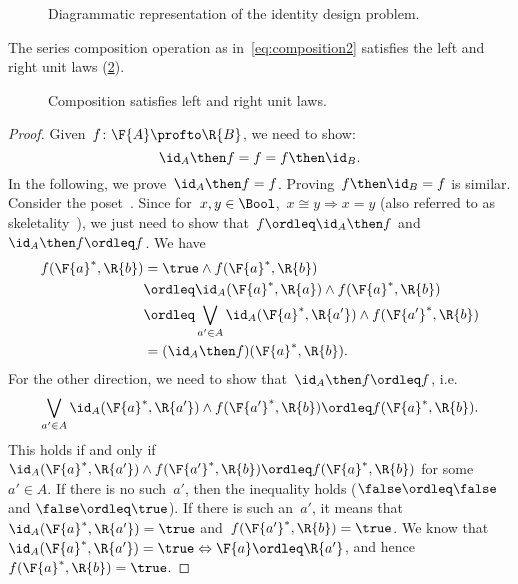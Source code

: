\begin{figure}[h!]
  \begin{center}
  \end{center}
  \caption{Diagrammatic representation of the identity design problem. \label{fig:identitydp}}
\end{figure}

\begin{lemma}
  The series composition operation as in~\cref{eq:composition2} satisfies the left and right unit laws (\cref{fig:compositionunital}).
  \begin{figure}[h!]
    \begin{center}
    \end{center}
    \caption{Composition satisfies left and right unit laws. \label{fig:compositionunital}}
  \end{figure}
\end{lemma}

\begin{proof}
Given~$f\colon \F{A}\profto \R{B}$, we need to show:
  \begin{equation}
    \id_A \then f= f = f\then \id_B.
  \end{equation}
  In the following, we prove~$\id_A \then f = f$. Proving~$f\then \id_B=f$ is similar.
  Consider the poset~\Bool. Since for~$x,y\in \Bool$,~$x\cong y \Rightarrow x=y$ (also referred to as skeletality~\cite{fong2019}), we just need to show that~$f\ordleq \id_A\then f$ and~$\id_A\then f\ordleq f$.
  We have
  \begin{equation}
    \begin{aligned}
      f(\F{a}^*,\R{b})&=\true \wedge f(\F{a}^*,\R{b})\\
      &\ordleq \id_A(\F{a}^*,\R{a}) \wedge f(\F{a}^*,\R{b})\\
      &\ordleq \bigvee_{a'\in A}\id_A(\F{a}^*,\R{a'})\wedge f(\F{a'}^*,\R{b})\\
      &=(\id_A\then f)(\F{a}^*,\R{b}).
    \end{aligned}
  \end{equation}
  For the other direction, we need to show that~$\id_A\then f\ordleq f$, i.e.
  \begin{equation}
    \bigvee_{a'\in A}\id_A(\F{a}^*,\R{a'})\wedge f(\F{a'}^*,\R{b}) \ordleq f(\F{a}^*,\R{b}).
  \end{equation}
  This holds if and only if~$\id_A(\F{a}^*,\R{a'})\wedge f(\F{a'}^*,\R{b}) \ordleq f(\F{a}^*,\R{b})$ for some~$a'\in A$. If there is no such~$a'$, then the inequality holds ($\false \ordleq \false$ and $\false \ordleq \true$). If there is such an~$a'$, it means that~$\id_A(\F{a}^*,\R{a'})=\true$ and~$f(\F{a'}^*,\R{b})=\true$. We know that~$\id_A(\F{a}^*,\R{a'})=\true \Leftrightarrow \F{a}\ordleq \R{a'}$, and hence~$f(\F{a}^*,\R{b})=\true$.
\end{proof}

